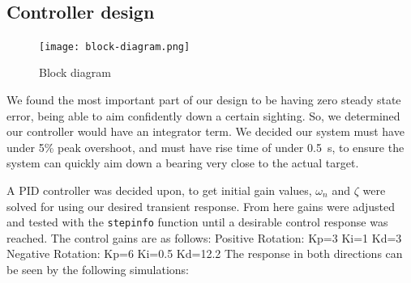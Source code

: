 
﻿\subsection{Controller design}
 
\begin{figure}[h!]
    \begin{center}  
    \texttt{[image: block-diagram.png]}    
    \end{center}
    \caption{Block diagram}
    \label{fig:controller1}
\end{figure}

We found the most important part of our design to be having zero steady state error, being able to aim confidently down a certain sighting. So, we determined our controller would have an integrator term. We decided our system must have under 5\% peak overshoot, and must have rise time of under \SI{0.5}{\second}, to ensure the system can quickly aim down a bearing very close to the actual target.

A PID controller was decided upon, to get initial gain values, $\omega_n$ and $\zeta$ were solved for using our desired transient response. From here gains were adjusted and tested with the \lstinline{stepinfo} function until a desirable control response was reached. The control gains are as follows:
Positive Rotation: Kp=3 Ki=1   Kd=3
Negative Rotation: Kp=6 Ki=0.5 Kd=12.2
The response in both directions can be seen by the following simulations:

